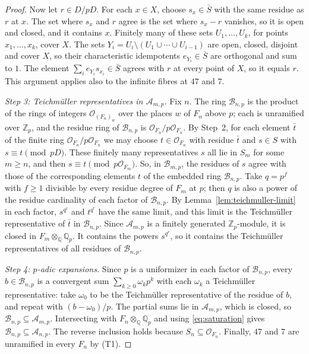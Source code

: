 \documentclass[11pt]{article}
\theoremstyle{plain}
\theoremstyle{definition}
\theoremstyle{remark}
\newcommand{\Z}{\mathbb Z}
\newcommand{\Q}{\mathbb Q}
\newcommand{\OO}{\mathcal O}
\begin{document}
\begin{proof}
Now let $r\in D/pD$.  For each $x\in X$, choose $s_x\in\bar S$ with the
same residue as $r$ at $x$.  The set where $s_x$ and $r$ agree is the set
where $s_x-r$ vanishes, so it is open and closed, and it contains $x$.
Finitely many of these sets $U_1,\dots,U_k$, for points
$x_1,\dots,x_k$, cover $X$.  The sets
$Y_i=U_i\setminus(U_1\cup\cdots\cup U_{i-1})$ are open, closed, disjoint
and cover $X$, so their characteristic idempotents $e_{Y_i}\in\bar S$ are
orthogonal and sum to $1$.  The element $\sum_ie_{Y_i}s_{x_i}\in\bar S$
agrees with $r$ at every point of $X$, so it equals $r$.  This argument
applies also to the infinite fibres at $47$ and $7$.

\emph{Step 3: Teichm\"uller representatives in $\mathcal A_{m,p}$.}  Fix
$n$.  The ring $\mathcal B_{n,p}$ is the product of the rings of integers
$\OO_{(F_n)_w}$ over the places $w$ of $F_n$ above $p$; each is unramified
over $\Z_p$, and the residue ring of $\mathcal B_{n,p}$ is
$\OO_{F_n}/p\OO_{F_n}$.  By Step~2, for each element $\bar t$ of the
finite ring $\OO_{F_n}/p\OO_{F_n}$ we may choose $t\in\OO_{F_n}$ with
residue $\bar t$ and $s\in S$ with $s\equiv t\pmod{pD}$.  These finitely
many representatives $s$ all lie in $S_m$ for some $m\geq n$, and then
$s\equiv t\pmod{p\OO_{F_m}}$.  So, in $\mathcal B_{m,p}$, the residues of
$s$ agree with those of the corresponding elements $t$ of the embedded
ring $\mathcal B_{n,p}$.  Take $q=p^f$ with $f\geq1$ divisible by
every residue degree of $F_m$ at $p$; then $q$ is also a power of the
residue cardinality of each factor of $\mathcal B_{n,p}$.  By
Lemma~\ref{lem:teichmuller-limit} in each factor, $s^{q^r}$ and $t^{q^r}$
have the same limit, and this limit is the Teichm\"uller representative
of $\bar t$ in $\mathcal B_{n,p}$.  Since $\mathcal A_{m,p}$ is a finitely
generated $\Z_p$-module, it is closed in $F_m\otimes_\Q\Q_p$.  It contains
the powers $s^{q^r}$, so it contains the Teichm\"uller representatives of
all residues of $\mathcal B_{n,p}$.

\emph{Step 4: $p$-adic expansions.}  Since $p$ is a uniformizer in each
factor of $\mathcal B_{n,p}$, every $b\in\mathcal B_{n,p}$ is a convergent
sum $\sum_{k\geq0}\omega_kp^k$ with each $\omega_k$ a Teichm\"uller
representative: take $\omega_0$ to be the Teichm\"uller representative of
the residue of $b$, and repeat with $(b-\omega_0)/p$.  The partial sums
lie in $\mathcal A_{m,p}$, which is closed, so
$\mathcal B_{n,p}\subseteq\mathcal A_{m,p}$.  Intersecting with
$F_n\otimes_\Q\Q_p$ and using \eqref{eq:saturation} gives
$\mathcal B_{n,p}\subseteq\mathcal A_{n,p}$.  The reverse inclusion holds
because $S_n\subseteq\OO_{F_n}$.  Finally, $47$ and $7$ are unramified in
every $F_n$ by (T1).
\end{proof}
\end{document}
